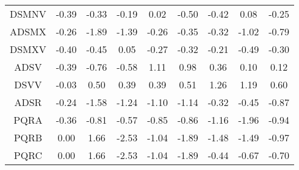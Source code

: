 \documentclass[11pt,a4paper]{report}
\begin{document}
\begin{longtable}{ | c || c | c | c | c | c | c | c || c |}
DSMNV &  \cellcolor[HTML]{FFF7F7} -0.39 &  \cellcolor[HTML]{FFF7F7} -0.33 &  \cellcolor[HTML]{FFF7F7} -0.19 &  \cellcolor[HTML]{FFFFFF} 0.02 &  \cellcolor[HTML]{FFEFEF} -0.50 &  \cellcolor[HTML]{FFF7F7} -0.42 &  \cellcolor[HTML]{FFFFFF} 0.08 &  \cellcolor[HTML]{FFF7F7} -0.25 \\
ADSMX &  \cellcolor[HTML]{FFF7F7} -0.26 &  \cellcolor[HTML]{FFCFCF} -1.89 &  \cellcolor[HTML]{FFDFDF} -1.39 &  \cellcolor[HTML]{FFF7F7} -0.26 &  \cellcolor[HTML]{FFF7F7} -0.35 &  \cellcolor[HTML]{FFF7F7} -0.32 &  \cellcolor[HTML]{FFE7E7} -1.02 &  \cellcolor[HTML]{FFEFEF} -0.79 \\
DSMXV &  \cellcolor[HTML]{FFF7F7} -0.40 &  \cellcolor[HTML]{FFF7F7} -0.45 &  \cellcolor[HTML]{FFFFFF} 0.05 &  \cellcolor[HTML]{FFF7F7} -0.27 &  \cellcolor[HTML]{FFF7F7} -0.32 &  \cellcolor[HTML]{FFF7F7} -0.21 &  \cellcolor[HTML]{FFEFEF} -0.49 &  \cellcolor[HTML]{FFF7F7} -0.30 \\
ADSV &  \cellcolor[HTML]{FFF7F7} -0.39 &  \cellcolor[HTML]{FFEFEF} -0.76 &  \cellcolor[HTML]{FFEFEF} -0.58 &  \cellcolor[HTML]{E7E7FF} 1.11 &  \cellcolor[HTML]{E7E7FF} 0.98 &  \cellcolor[HTML]{F7F7FF} 0.36 &  \cellcolor[HTML]{FFFFFF} 0.10 &  \cellcolor[HTML]{FFFFFF} 0.12 \\
DSVV &  \cellcolor[HTML]{FFFFFF} -0.03 &  \cellcolor[HTML]{EFEFFF} 0.50 &  \cellcolor[HTML]{F7F7FF} 0.39 &  \cellcolor[HTML]{F7F7FF} 0.39 &  \cellcolor[HTML]{EFEFFF} 0.51 &  \cellcolor[HTML]{DFDFFF} 1.26 &  \cellcolor[HTML]{DFDFFF} 1.19 &  \cellcolor[HTML]{EFEFFF} 0.60 \\
ADSR &  \cellcolor[HTML]{FFF7F7} -0.24 &  \cellcolor[HTML]{FFD7D7} -1.58 &  \cellcolor[HTML]{FFDFDF} -1.24 &  \cellcolor[HTML]{FFE7E7} -1.10 &  \cellcolor[HTML]{FFDFDF} -1.14 &  \cellcolor[HTML]{FFF7F7} -0.32 &  \cellcolor[HTML]{FFF7F7} -0.45 &  \cellcolor[HTML]{FFE7E7} -0.87 \\
PQRA &  \cellcolor[HTML]{FFF7F7} -0.36 &  \cellcolor[HTML]{FFE7E7} -0.81 &  \cellcolor[HTML]{FFEFEF} -0.57 &  \cellcolor[HTML]{FFE7E7} -0.85 &  \cellcolor[HTML]{FFE7E7} -0.86 &  \cellcolor[HTML]{FFDFDF} -1.16 &  \cellcolor[HTML]{FFCFCF} -1.96 &  \cellcolor[HTML]{FFE7E7} -0.94 \\
PQRB &  \cellcolor[HTML]{FFFFFF} 0.00 &  \cellcolor[HTML]{D7D7FF} 1.66 &  \cellcolor[HTML]{FFBFBF} -2.53 &  \cellcolor[HTML]{FFE7E7} -1.04 &  \cellcolor[HTML]{FFCFCF} -1.89 &  \cellcolor[HTML]{FFD7D7} -1.48 &  \cellcolor[HTML]{FFD7D7} -1.49 &  \cellcolor[HTML]{FFE7E7} -0.97 \\
PQRC &  \cellcolor[HTML]{FFFFFF} 0.00 &  \cellcolor[HTML]{D7D7FF} 1.66 &  \cellcolor[HTML]{FFBFBF} -2.53 &  \cellcolor[HTML]{FFE7E7} -1.04 &  \cellcolor[HTML]{FFCFCF} -1.89 &  \cellcolor[HTML]{FFF7F7} -0.44 &  \cellcolor[HTML]{FFEFEF} -0.67 &  \cellcolor[HTML]{FFEFEF} -0.70 \\

\end{longtable}
\end{document}
